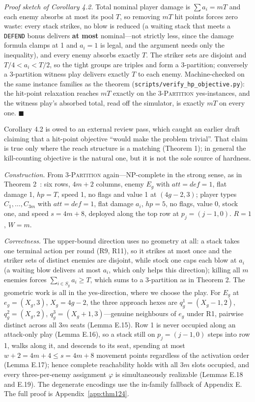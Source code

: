 \documentclass[11pt,a4paper]{article}
\theoremstyle{plain}
\theoremstyle{definition}
\theoremstyle{plain}
\theoremstyle{definition}
\theoremstyle{remark}
\newcommand{\THREEPART}{\textsc{3-Partition}}
\newcommand{\src}[1]{\texttt{#1}}
\newcommand{\qedbox}{\hfill$\blacksquare$}
\begin{document}
\smallskip
\noindent\emph{Proof sketch of Corollary 4.2.} Total nominal player damage is $\sum a_i=mT$ and
each enemy absorbs at most its pool $T$, so removing $mT$ hit points forces zero waste: every
stack strikes, no blow is reduced (a waiting stack that meets a \texttt{DEFEND} bonus delivers
\textbf{at most} nominal---not strictly less, since the damage formula clamps at 1 and $a_i=1$ is
legal, and the argument needs only the inequality), and every enemy absorbs exactly $T$. The
striker sets are disjoint
and $T/4<a_i<T/2$, so the tight groups are triples and form a 3-partition; conversely a
3-partition witness play delivers exactly $T$ to each enemy. Machine-checked on the same
instance families as the theorem (\src{scripts/verify\_hp\_objective.py}): the hit-point
relaxation reaches $mT$ exactly on the \THREEPART{} yes-instances, and the witness play's
absorbed total, read off the simulator, is exactly $mT$ on every one. \qedbox

\smallskip
Corollary 4.2 is owed to an external review pass, which caught an earlier draft claiming
that a hit-point objective ``would make the problem trivial''. That claim is true only where the
reach structure is a matching (Theorem 1); in general the kill-counting objective is the natural
one, but it is not the sole source of hardness.

\smallskip
\noindent\emph{Construction.} From \THREEPART{} again---NP-complete in the strong sense, as
in Theorem 2~\cite[SP15]{GJ79}: six rows, $4m+2$ columns, enemy $E_g$ with
$\mathit{att}=\mathit{def}=1$, flat damage 1, $\mathit{hp}=T$, speed 1, no flags and value 1 at
$(4g-2,3)$; player types $C_1,\dots,C_{3m}$ with $\mathit{att}=\mathit{def}=1$, flat damage
$a_i$, $\mathit{hp}=5$, no flags, value 0, stock one, and speed $s=4m+8$, deployed along the
top row at $p_j=(j-1,0)$. $R=1$, $W=m$.

\smallskip
\noindent\emph{Correctness.} The upper-bound direction uses no geometry at all: a stack takes
one terminal action per round (R9, R11), so it strikes at most once and the striker sets of
distinct enemies are disjoint, while stock one caps each blow at $a_i$ (a waiting blow
delivers at most $a_i$, which only helps this direction); killing
all $m$ enemies forces $\sum_{i\in S_g}a_i\ge T$, which sums to a 3-partition as in Theorem 2.
The geometric work is all in the yes-direction, where we choose the play. For $E_g$ at
$e_g=(X_g,3)$, $X_g=4g-2$, the three approach hexes are $q_g^1=(X_g-1,2)$, $q_g^2=(X_g,2)$,
$q_g^3=(X_g+1,3)$---genuine neighbours of $e_g$ under R1, pairwise distinct across all $3m$
seats (Lemma E.15). Row 1 is never occupied along an attack-only play (Lemma E.16), so a stack
still on $p_j=(j-1,0)$ steps into row 1, walks along it, and descends to its seat, spending at
most $w+2=4m+4\le s=4m+8$ movement points regardless of the activation order (Lemma E.17);
hence complete reachability holds with all $3m$ slots occupied, and every three-per-enemy
assignment $\varphi$ is simultaneously realizable (Lemmas E.18 and E.19). The degenerate
encodings use the in-family fallback of Appendix E. The full proof is Appendix~\ref{app:thm124}.
\end{document}
